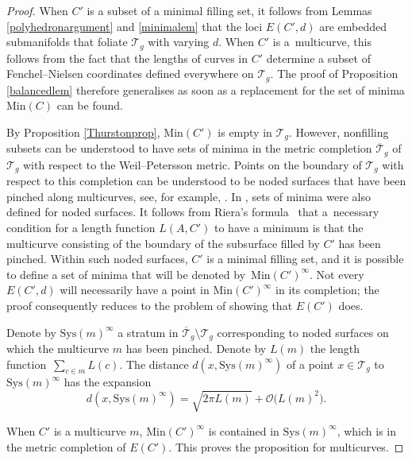 \begin{proof}
When $C'$ is a subset of a minimal filling set, it follows from Lemmas \ref{polyhedronargument} and \ref{minimalem} that the loci $E(C',d)$ are embedded submanifolds that foliate $\mathcal{T}_{g}$ with varying $d$. When $C'$ is a~multicurve, this follows from the fact that the lengths of curves in $C'$ determine a subset of Fenchel--Nielsen coordinates defined everywhere on $\mathcal{T}_{g}$. The proof of Proposition \ref{balancedlem} therefore generalises as soon as a replacement for the set of minima $\mathrm{Min}(C)$ can be found.

By Proposition \ref{Thurstonprop}, $\mathrm{Min}(C')$ is empty in $\mathcal{T}_{g}$. However, nonfilling subsets can be understood to have sets of minima in the metric completion $\overline{\mathcal{T}}_{g}$ of $\mathcal{T}_{g}$ with respect to the Weil--Petersson metric. Points on the boundary of $\mathcal{T}_{g}$ with respect to this completion can be understood to be noded surfaces that have been pinched along multicurves, see, for example, \cite{wolpert2005}. In \cite{SchmutzMorse}, sets of minima were also defined for noded surfaces. It follows from Riera's formula~\cite{Riera} that a~necessary condition for a length function $L(A, C')$ to have a minimum is that the multicurve consisting of the boundary of the subsurface filled by $C'$ has been pinched. Within such noded surfaces, $C'$ is a minimal filling set, and it is possible to define a set of minima that will be denoted by~$\mathrm{Min}(C')^{\infty}$. Not every $E(C',d)$ will necessarily have a point in $\mathrm{Min}(C')^{\infty}$ in its completion; the proof consequently reduces to the problem of showing that $E(C')$ does.

\begin{Corollary}
\label{wolcor}
Denote by $\mathrm{Sys}(m)^{\infty}$ a stratum in $\overline{\mathcal{T}}_{g}\setminus \mathcal{T}_{g}$ corresponding to noded surfaces on which the multicurve $m$ has been pinched. Denote by $L(m)$ the length function~$\sum_{c\in m}L(c)$.
The distance $d(x, \mathrm{Sys}(m)^{\infty})$ of a point $x\in \mathcal{T}_{g}$ to $\mathrm{Sys}(m)^{\infty}$ has the expansion
\begin{equation*}
d(x, \mathrm{Sys}(m)^{\infty})=\sqrt{2\pi L(m)}+\mathcal{O}\bigl(L(m)^{2}\bigr).
\end{equation*}
\end{Corollary}


When $C'$ is a multicurve $m$, $\mathrm{Min}(C')^{\infty}$ is contained in $\mathrm{Sys}(m)^{\infty}$, which is in the metric completion of $E(C')$. This proves the proposition for multicurves.


\end{proof}
